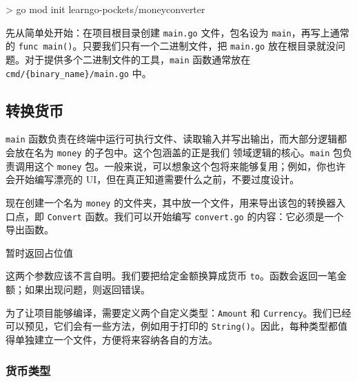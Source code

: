 \begin{shellcode}[]
> go mod init learngo-pockets/moneyconverter
\end{shellcode}

先从简单处开始：在项目根目录创建 \texttt{main.go} 文件，包名设为 \texttt{main}，再写上通常的 \texttt{func main()}。只要我们只有一个二进制文件，把 \texttt{main.go} 放在根目录就没问题。对于提供多个二进制文件的工具，\texttt{main} 函数通常放在 \texttt{cmd/\{binary\_name\}/main.go} 中。

\subsection{转换货币}

\texttt{main} 函数负责在终端中运行可执行文件、读取输入并写出输出，而大部分逻辑都会放在名为 \texttt{money} 的子包中。这个包涵盖的正是我们
领域逻辑的核心。\texttt{main} 包负责调用这个 \texttt{money} 包。一般来说，可以想象这个包将来能够复用；例如，你也许会开始编写漂亮的 UI，但在真正知道需要什么之前，不要过度设计。

现在创建一个名为 \texttt{money} 的文件夹，其中放一个文件，用来导出该包的转换器入口点，即 \texttt{Convert} 函数。我们可以开始编写 \texttt{convert.go} 的内容：它必须是一个导出函数。


\begin{codeannotations}
\item 暂时返回占位值
\end{codeannotations}

这两个参数应该不言自明。我们要把给定金额换算成货币 \texttt{to}。函数会返回一笔金额；如果出现问题，则返回错误。

为了让项目能够编译，需要定义两个自定义类型：\texttt{Amount} 和 \texttt{Currency}。我们已经可以预见，它们会有一些方法，例如用于打印的 \texttt{String()}。因此，每种类型都值得单独建立一个文件，方便将来容纳各自的方法。

\subsubsection*{货币类型}

